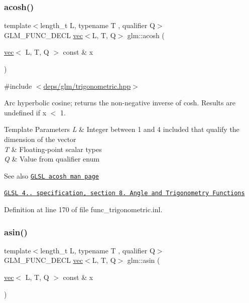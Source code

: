 \subsubsection{\texorpdfstring{acosh()}{acosh()}}
{\footnotesize\ttfamily template$<$length\+\_\+t L, typename T , qualifier Q$>$ \\
G\+L\+M\+\_\+\+F\+U\+N\+C\+\_\+\+D\+E\+CL \hyperlink{structglm_1_1vec}{vec}$<$L, T, Q$>$ glm\+::acosh (\begin{DoxyParamCaption}\item[{\hyperlink{structglm_1_1vec}{vec}$<$ L, T, Q $>$ const \&}]{x }\end{DoxyParamCaption})}



{\ttfamily \#include $<$\hyperlink{trigonometric_8hpp}{deps/glm/trigonometric.\+hpp}$>$}

Arc hyperbolic cosine; returns the non-\/negative inverse of cosh. Results are undefined if x $<$ 1.


\begin{DoxyTemplParams}{Template Parameters}
{\em L} & Integer between 1 and 4 included that qualify the dimension of the vector \\
\hline
{\em T} & Floating-\/point scalar types \\
\hline
{\em Q} & Value from qualifier enum\\
\hline
\end{DoxyTemplParams}
\begin{DoxySeeAlso}{See also}
\href{http://www.opengl.org/sdk/docs/manglsl/xhtml/acosh.xml}{\tt G\+L\+SL acosh man page} 

\href{http://www.opengl.org/registry/doc/GLSLangSpec.4.20.8.pdf}{\tt G\+L\+SL 4.. specification, section 8. Angle and Trigonometry Functions} 
\end{DoxySeeAlso}


Definition at line 170 of file func\+\_\+trigonometric.\+inl.

\mbox{\label{group__core__func__trigonometric_ga0552d2df4865fa8c3d7cfc3ec2caac73}} 
\subsubsection{\texorpdfstring{asin()}{asin()}}
{\footnotesize\ttfamily template$<$length\+\_\+t L, typename T , qualifier Q$>$ \\
G\+L\+M\+\_\+\+F\+U\+N\+C\+\_\+\+D\+E\+CL \hyperlink{structglm_1_1vec}{vec}$<$L, T, Q$>$ glm\+::asin (\begin{DoxyParamCaption}\item[{\hyperlink{structglm_1_1vec}{vec}$<$ L, T, Q $>$ const \&}]{x }\end{DoxyParamCaption})}



